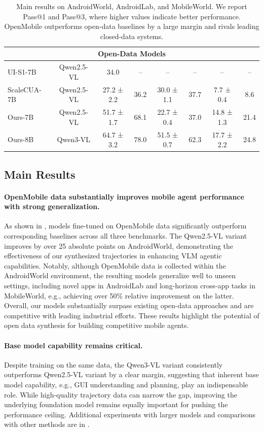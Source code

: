 \documentclass{article} %
\begin{document}
\begin{table}[t]
{\begin{tabular}{l|c|cc|cc|cc}
\multicolumn{8}{c}{\cellcolor{gray!15} Open-Data Models} \\
\midrule
UI-S1-7B & {\fontsize{8}{9}\selectfont Qwen2.5-VL} & 34.0 & -- & -- & -- & -- & -- \\
ScaleCUA-7B & {\fontsize{8}{9}\selectfont Qwen2.5-VL} & 27.2 ± 2.2 & 36.2 & 30.0 ± 1.1 & 37.7 & 7.7 ± 0.4 & 8.6 \\
\rowcolor{myrowblue}
Ours-7B & {\fontsize{8}{9}\selectfont Qwen2.5-VL} & 51.7 ± 1.7 & 68.1 & 22.7 ± 0.4 & 37.0 & 14.8 ± 1.3 & 21.4 \\
\rowcolor{myrowblue_1}
Ours-8B & {\fontsize{8}{9}\selectfont Qwen3-VL} & 64.7 ± 3.2 & 78.0 & 51.5 ± 0.7 & 62.3 & 17.7 ± 2.2 & 24.8 \\
\bottomrule
\end{tabular}
}
\caption{Main results on AndroidWorld, AndroidLab, and MobileWorld. We report Pass@1 and Pass@3, where higher values indicate better performance. OpenMobile outperforms open-data baselines by a large margin and rivals leading closed-data systems.}
\label{tab:main_results}
\end{table}

\subsection{Main Results}

\paragraph{OpenMobile data substantially improves mobile agent performance with strong generalization.}
As shown in , models fine-tuned on OpenMobile data significantly outperform corresponding baselines across all three benchmarks.
The Qwen2.5-VL variant improves by over 25 absolute points on AndroidWorld, demonstrating the effectiveness of our synthesized trajectories in enhancing VLM agentic capabilities.
Notably, although OpenMobile data is collected within the AndroidWorld environment, the resulting models generalize well to unseen settings, including novel apps in AndroidLab and long-horizon cross-app tasks in MobileWorld, e.g., achieving over 50\% relative improvement on the latter.
Overall, our models substantially surpass existing open-data approaches and are competitive with leading industrial efforts.
These results highlight the potential of open data synthesis for building competitive mobile agents.

\paragraph{Base model capability remains critical.}
Despite training on the same data, the Qwen3-VL variant consistently outperforms Qwen2.5-VL variant by a clear margin, suggesting that inherent base model capability, e.g., GUI understanding and planning, play an indispensable role.
While high-quality trajectory data can narrow the gap, improving the underlying foundation model remains equally important for pushing the performance ceiling.
Additional experiments with larger models and comparisons with other methods are in .
\end{document}
